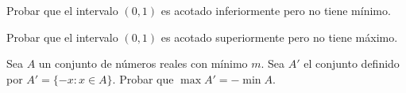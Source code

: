 
    \item Probar que el intervalo $(0,1)$ es acotado inferiormente pero no tiene mínimo.

    \item Probar que el intervalo $(0,1)$ es acotado superiormente pero no tiene máximo.

    \item Sea $A$ un conjunto de números reales con mínimo $m$. Sea $A'$ el conjunto definido por $A'=\{-x : x \in A\}$. Probar que $\max A' = -\min A$.
